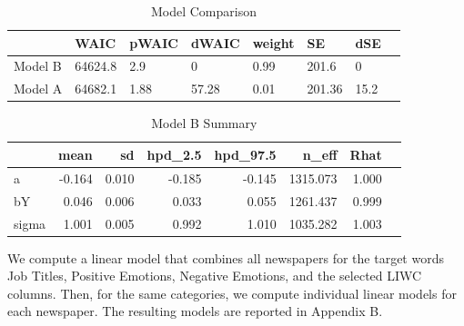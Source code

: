 \documentclass[11pt,a4paper]{article}
\begin{document}
\begin{table}
\tiny
\begin{tabular}{llllllll}
\toprule
{} &     WAIC & pWAIC &  dWAIC & weight &      SE &   dSE \\
\midrule
Model B &  64624.8 &   2.9 &      0 &   0.99 &   201.6 &     0 \\
Model A &  64682.1 &  1.88 &  57.28 &   0.01 &  201.36 &  15.2 \\
\bottomrule
\end{tabular}
\caption{Model Comparison}
\label{table:model1}	
\end{table}

\begin{table}
\tiny
\begin{tabular}{lrrrrrrr}
\toprule
{} &   mean &     sd &  hpd\_2.5 &  hpd\_97.5 &     n\_eff &   Rhat \\
\midrule
a     & -0.164 &  0.010 &       -0.185 &    -0.145 &  1315.073 &  1.000 \\
bY    &  0.046 &  0.006 &       0.033 &     0.055 &  1261.437 &  0.999 \\
sigma &  1.001 &  0.005 &       0.992 &     1.010 &  1035.282 &  1.003 \\
\bottomrule
\end{tabular}
\caption{Model B Summary}
\label{table:model2}
\end{table}

We compute a linear model that combines all newspapers for the target words Job Titles, Positive Emotions, Negative Emotions, and the selected LIWC columns. Then, for the same categories, we compute individual linear models for each newspaper. The resulting models are reported in Appendix B.
\end{document}
